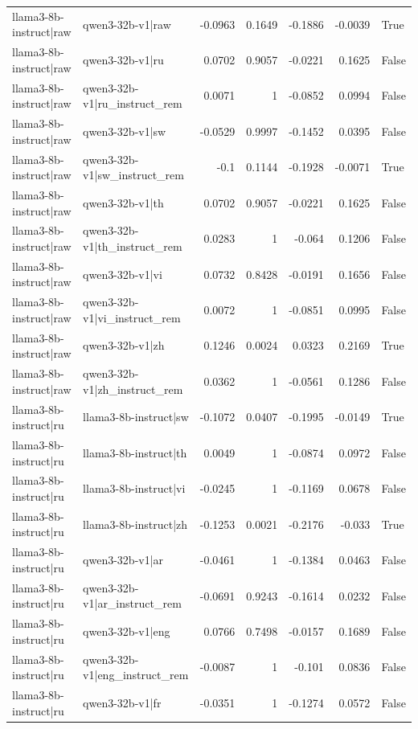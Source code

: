 \begin{table}
\begin{tabular}{l l r r r r l}
llama3-8b-instruct|raw & qwen3-32b-v1|raw & -0.0963 & 0.1649 & -0.1886 & -0.0039 & True \\
llama3-8b-instruct|raw & qwen3-32b-v1|ru & 0.0702 & 0.9057 & -0.0221 & 0.1625 & False \\
llama3-8b-instruct|raw & qwen3-32b-v1|ru_instruct_rem & 0.0071 & 1 & -0.0852 & 0.0994 & False \\
llama3-8b-instruct|raw & qwen3-32b-v1|sw & -0.0529 & 0.9997 & -0.1452 & 0.0395 & False \\
llama3-8b-instruct|raw & qwen3-32b-v1|sw_instruct_rem & -0.1 & 0.1144 & -0.1928 & -0.0071 & True \\
llama3-8b-instruct|raw & qwen3-32b-v1|th & 0.0702 & 0.9057 & -0.0221 & 0.1625 & False \\
llama3-8b-instruct|raw & qwen3-32b-v1|th_instruct_rem & 0.0283 & 1 & -0.064 & 0.1206 & False \\
llama3-8b-instruct|raw & qwen3-32b-v1|vi & 0.0732 & 0.8428 & -0.0191 & 0.1656 & False \\
llama3-8b-instruct|raw & qwen3-32b-v1|vi_instruct_rem & 0.0072 & 1 & -0.0851 & 0.0995 & False \\
llama3-8b-instruct|raw & qwen3-32b-v1|zh & 0.1246 & 0.0024 & 0.0323 & 0.2169 & True \\
llama3-8b-instruct|raw & qwen3-32b-v1|zh_instruct_rem & 0.0362 & 1 & -0.0561 & 0.1286 & False \\
llama3-8b-instruct|ru & llama3-8b-instruct|sw & -0.1072 & 0.0407 & -0.1995 & -0.0149 & True \\
llama3-8b-instruct|ru & llama3-8b-instruct|th & 0.0049 & 1 & -0.0874 & 0.0972 & False \\
llama3-8b-instruct|ru & llama3-8b-instruct|vi & -0.0245 & 1 & -0.1169 & 0.0678 & False \\
llama3-8b-instruct|ru & llama3-8b-instruct|zh & -0.1253 & 0.0021 & -0.2176 & -0.033 & True \\
llama3-8b-instruct|ru & qwen3-32b-v1|ar & -0.0461 & 1 & -0.1384 & 0.0463 & False \\
llama3-8b-instruct|ru & qwen3-32b-v1|ar_instruct_rem & -0.0691 & 0.9243 & -0.1614 & 0.0232 & False \\
llama3-8b-instruct|ru & qwen3-32b-v1|eng & 0.0766 & 0.7498 & -0.0157 & 0.1689 & False \\
llama3-8b-instruct|ru & qwen3-32b-v1|eng_instruct_rem & -0.0087 & 1 & -0.101 & 0.0836 & False \\
llama3-8b-instruct|ru & qwen3-32b-v1|fr & -0.0351 & 1 & -0.1274 & 0.0572 & False \\

\end{tabular}
\end{table}
